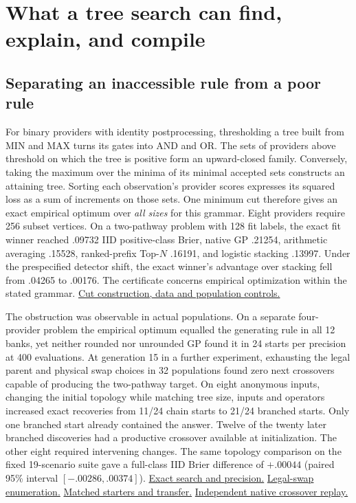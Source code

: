 \section{What a tree search can find, explain, and compile}
\label{sec:mechanism-history}

\subsection{Separating an inaccessible rule from a poor rule}

For binary providers with identity postprocessing, thresholding a tree built
from MIN and MAX turns its gates into AND and OR. The sets of providers above
threshold on which the tree is positive form an upward-closed family.
Conversely, taking the maximum over the minima of its minimal accepted sets
constructs an attaining tree. Sorting each observation's provider scores
expresses its squared loss as a sum of increments on those sets. One minimum
cut therefore gives an exact empirical optimum over \emph{all sizes} for this
grammar. Eight providers require 256 subset vertices. On a two-pathway problem
with 128 fit labels, the exact fit winner reached .09732 IID positive-class
Brier, native GP .21254, arithmetic averaging .15528, ranked-prefix Top-$N$
.16191, and logistic stacking .13997. Under the prespecified detector shift,
the exact winner's advantage over stacking fell from .04265 to .00176.
The certificate concerns empirical optimization within the stated grammar.
\href{https://github.com/damiankucharski/fusionbench/blob/1f12dbf/docs/ensemble-study/search-regret/continuous.md}{Cut construction, data and population controls.}

The obstruction was observable in actual populations. On a separate
four-provider problem the empirical optimum equalled the generating rule in
all 12 banks, yet neither rounded nor unrounded GP found it in 24 starts per
precision at 400 evaluations. At generation 15 in a further experiment,
exhausting the legal parent and physical swap choices in 32 populations found
zero next crossovers capable of producing the two-pathway target. On eight
anonymous inputs, changing the initial topology while matching tree size,
inputs and operators increased exact recoveries from 11/24 chain starts to
21/24 branched starts. Only one branched start already contained the answer.
Twelve of the twenty later branched discoveries had a productive crossover
available at initialization. The other eight required intervening changes.
The same topology comparison on the fixed 19-scenario suite gave a full-class
IID Brier difference of $+.00044$ (paired 95\% interval
$[-.00286,.00374]$).
\href{https://github.com/damiankucharski/fusionbench/blob/fbeae0d/docs/ensemble-study/selection-precision/README.md}{Exact search and precision.}
\href{https://github.com/damiankucharski/fusionbench/blob/31466b1/docs/ensemble-study/semantic-donors/README.md}{Legal-swap enumeration.}
\href{https://github.com/damiankucharski/fusionbench/blob/d79f228/docs/ensemble-study/seed-geometry/README.md}{Matched starters and transfer.}
\href{https://github.com/damiankucharski/OKAPI/blob/47029ef/experiments/initial_crossover/README.md}{Independent native crossover replay.}

